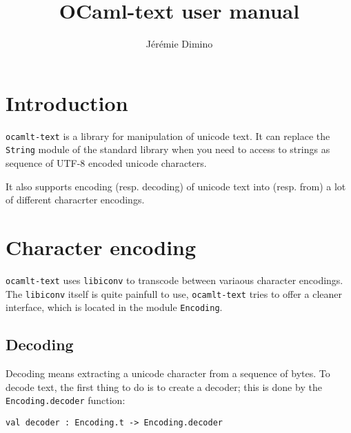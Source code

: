 \documentclass{article}
\title{OCaml-text user manual}
\author{Jérémie Dimino}
\newcommand{\oct}{\texttt{ocamlt-text}\xspace}
\begin{document}
\maketitle


\setcounter{tocdepth}{2}
\tableofcontents

\section{Introduction}

\oct is a library for manipulation of unicode text. It can replace the
\texttt{String} module of the standard library when you need to access
to strings as sequence of UTF-8 encoded unicode characters.

It also supports encoding (resp. decoding) of unicode text into
(resp. from) a lot of different characrter encodings.

\section{Character encoding}

\oct uses \texttt{libiconv} to transcode between variaous character
encodings. The \texttt{libiconv} itself is quite painfull to use, \oct
tries to offer a cleaner interface, which is located in the module
\texttt{Encoding}.

\subsection{Decoding}

Decoding means extracting a unicode character from a sequence of
bytes. To decode text, the first thing to do is to create a decoder;
this is done by the \texttt{Encoding.decoder} function:

\lstset{language=[Objective]Caml}\begin{lstlisting}
val decoder : Encoding.t -> Encoding.decoder
\end{lstlisting}
\end{document}
